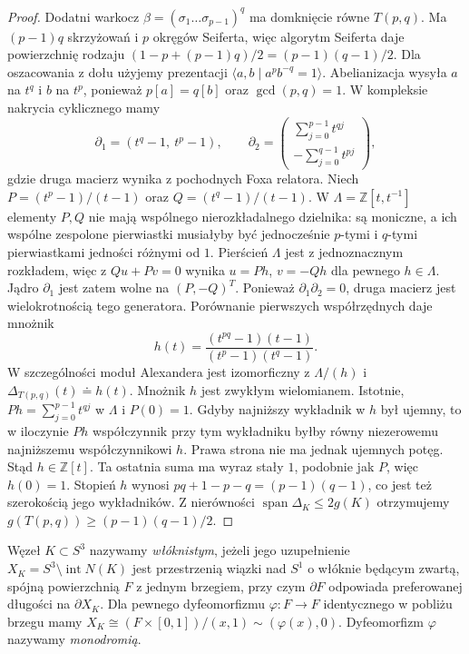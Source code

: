 \begin{proof}
Dodatni warkocz $\beta=(\sigma_1\dots\sigma_{p-1})^q$
ma domknięcie równe $T(p,q)$. Ma $(p-1)q$ skrzyżowań
i $p$ okręgów Seiferta, więc algorytm Seiferta daje
powierzchnię rodzaju $(1-p+(p-1)q)/2=(p-1)(q-1)/2$.
Dla oszacowania z dołu użyjemy prezentacji
$\langle a,b\mid a^pb^{-q}=1\rangle$.
Abelianizacja wysyła $a$ na $t^q$ i $b$ na $t^p$,
ponieważ $p[a]=q[b]$ oraz $\gcd(p,q)=1$.
W kompleksie nakrycia cyklicznego mamy
\[
\partial_1=(t^q-1,\ t^p-1),\qquad
\partial_2=\begin{pmatrix}
\sum_{j=0}^{p-1}t^{qj}\\
-\sum_{j=0}^{q-1}t^{pj}
\end{pmatrix},
\]
gdzie druga macierz wynika z pochodnych Foxa relatora.
Niech $P=(t^p-1)/(t-1)$ oraz $Q=(t^q-1)/(t-1)$.
W $\Lambda=\mathbb Z[t,t^{-1}]$ elementy $P,Q$
nie mają wspólnego nierozkładalnego dzielnika:
są moniczne, a ich wspólne zespolone pierwiastki
musiałyby być jednocześnie $p$-tymi i $q$-tymi
pierwiastkami jedności różnymi od $1$.
Pierścień $\Lambda$ jest z jednoznacznym rozkładem,
więc z $Qu+Pv=0$ wynika $u=Ph$, $v=-Qh$
dla pewnego $h\in\Lambda$.
Jądro $\partial_1$ jest zatem wolne na $(P,-Q)^T$.
Ponieważ $\partial_1\partial_2=0$, druga macierz
jest wielokrotnością tego generatora. Porównanie
pierwszych współrzędnych daje mnożnik
\[
h(t)=\frac{(t^{pq}-1)(t-1)}{(t^p-1)(t^q-1)}.
\]
W szczególności moduł Alexandera jest izomorficzny
z $\Lambda/(h)$ i $\Delta_{T(p,q)}(t)\doteq h(t)$.
Mnożnik $h$ jest zwykłym wielomianem. Istotnie,
$Ph=\sum_{j=0}^{p-1}t^{qj}$ w $\Lambda$ i $P(0)=1$.
Gdyby najniższy wykładnik w $h$ był ujemny, to
w iloczynie $Ph$ współczynnik przy tym wykładniku
byłby równy niezerowemu najniższemu współczynnikowi
$h$. Prawa strona nie ma jednak ujemnych potęg.
Stąd $h\in\mathbb Z[t]$.
Ta ostatnia suma ma wyraz stały $1$,
podobnie jak $P$, więc $h(0)=1$.
Stopień $h$ wynosi $pq+1-p-q=(p-1)(q-1)$,
co jest też szerokością jego wykładników. Z nierówności
$\operatorname{span}\Delta_K\leq2g(K)$ otrzymujemy
$g(T(p,q))\geq(p-1)(q-1)/2$.
\end{proof}

\begin{definicja}
Węzeł $K\subset S^3$ nazywamy \emph{włóknistym}, jeżeli jego
uzupełnienie $X_K=S^3\setminus\operatorname{int}N(K)$
jest przestrzenią wiązki nad $S^1$ o włóknie będącym zwartą,
spójną powierzchnią $F$ z jednym brzegiem, przy czym
$\partial F$ odpowiada preferowanej długości na
$\partial X_K$. Dla pewnego dyfeomorfizmu
$\varphi\colon F\to F$ identycznego w pobliżu brzegu mamy
$X_K\cong (F\times[0,1])/(x,1)\sim(\varphi(x),0)$.
Dyfeomorfizm $\varphi$ nazywamy \emph{monodromią}.
\end{definicja}

